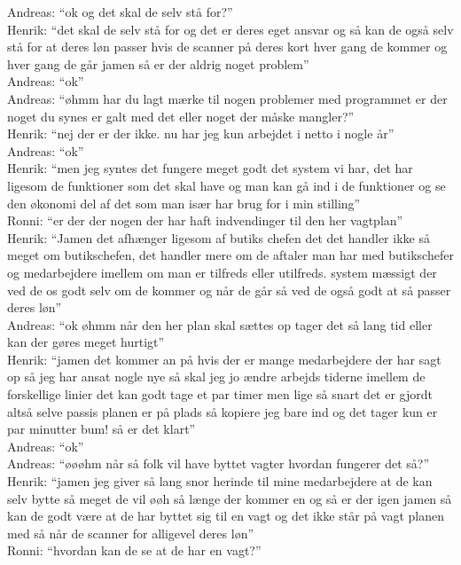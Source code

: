 Andreas: “ok og det skal de selv stå for?”\\
Henrik: “det skal de selv stå for og det er deres eget ansvar og så kan de også selv stå for at deres løn passer hvis de scanner på deres kort hver gang de kommer og hver gang de går jamen så er der aldrig noget problem”\\
Andreas: “ok”\\
Andreas: “øhmm har du lagt mærke til nogen problemer med programmet er der noget du synes er galt med det eller noget der måske mangler?”\\
Henrik: “nej der er der ikke. nu har jeg kun arbejdet i netto i nogle år”\\
Andreas: “ok”\\
Henrik: “men jeg syntes det fungere meget godt det system vi har, det har ligesom de funktioner som det skal have og man kan gå ind i de funktioner og se den økonomi del af det som man især har brug for i min stilling”\\
Ronni: “er der der nogen der har haft indvendinger til den her vagtplan”\\
Henrik: “Jamen det afhænger ligesom af butiks chefen det det handler ikke så meget om butikschefen, det handler mere om de aftaler man har med butikschefer og medarbejdere imellem om man er tilfreds eller utilfreds. system mæssigt der ved de os godt selv om de kommer og når de går så ved de også godt at så passer deres løn”\\
Andreas: “ok øhmm når den her plan skal sættes op tager det så lang tid eller kan der gøres meget hurtigt”\\
Henrik: “jamen det kommer an på hvis der er mange medarbejdere der har sagt op så jeg har ansat nogle nye så skal jeg jo ændre arbejds tiderne imellem de forskellige linier det kan godt tage et par timer men lige så snart det er gjordt altså selve passis planen er på plads så kopiere jeg bare ind og det tager kun er par minutter bum! så er det klart”\\
Andreas: “ok”\\
Andreas: “øøøhm når så folk vil have byttet vagter hvordan fungerer det så?”\\
Henrik: “jamen jeg giver så lang snor herinde til mine medarbejdere at de kan selv bytte så meget de vil øøh så længe der kommer en og så er der igen jamen så kan de godt være at de har byttet sig til en vagt og det ikke står på vagt planen med så når de scanner for alligevel deres løn”\\
Ronni: “hvordan kan de se at de har en vagt?”\\
